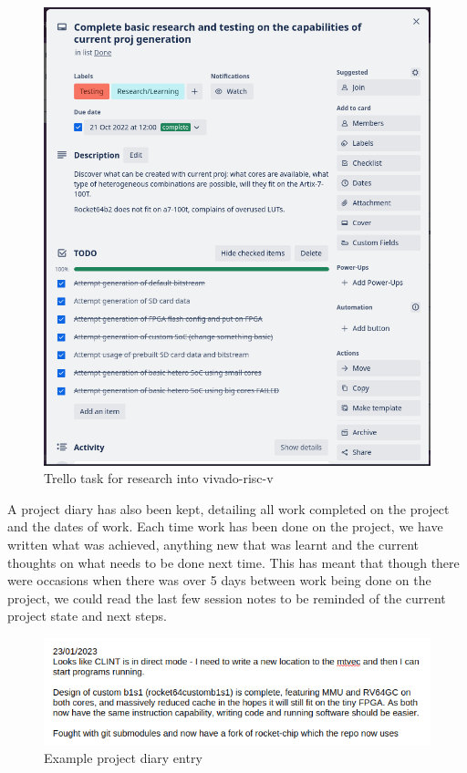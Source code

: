 \begin{figure}[h!]
    \centering
    \includegraphics[width=\textwidth]{img/trello.png}
    \caption{Trello task for research into vivado-risc-v\cite{vivado-risc-v}}
    \label{fig:trello}
\end{figure}

A project diary has also been kept, detailing all work completed on the project and the dates of work. Each time work has been done on the project, we have written what was achieved, anything new that was learnt and the current thoughts on what needs to be done next time. This has meant that though there were occasions when there was over 5 days between work being done on the project, we could read the last few session notes to be reminded of the current project state and next steps.

\begin{figure}
    \centering
    \includegraphics[width=\textwidth]{img/example_diary_entry.png}
    \caption{Example project diary entry}
    \label{fig:diary}
\end{figure}


